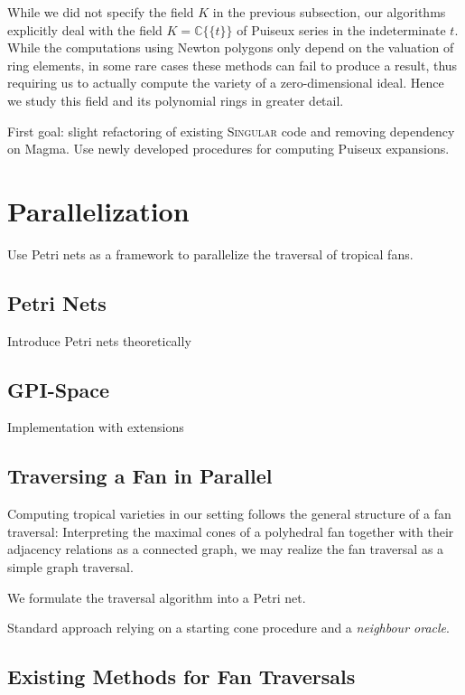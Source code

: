 \documentclass[
  paper=a4,
  DIV=14,
  fontsize=12pt,
  titlepage,
  bibliography=totoc,
  listof=totoc,
  pagesize=pdftex
]{scrartcl}
\numberwithin{figure}{section}
\numberwithin{equation}{section}
\numberwithin{table}{section}
\newcommand*\setC{\mathds{C}}
\newcommand*\puiseux[2]{#1\{\!\{#2\}\!\}}
\newcommand*\CCt{\puiseux{\setC}{t}}
\theoremstyle{definition}
\numberwithin{definition}{section}
\begin{document}
While we did not specify the field $K$ in the previous subsection, our algorithms
explicitly deal with the field $K = \CCt$ of Puiseux series in the indeterminate
$t$. While the computations using Newton polygons only depend on the valuation of ring
elements, in some rare cases these methods can fail to produce a result, thus requiring us
to actually compute the variety of a zero-dimensional ideal. Hence we study this field and
its polynomial rings in greater detail.

First goal: slight refactoring of existing \textsc{Singular} code and removing dependency on
Magma. Use newly developed procedures for computing Puiseux expansions.

\section{Parallelization}

Use Petri nets as a framework to parallelize the traversal of tropical fans.

\subsection{Petri Nets}

Introduce Petri nets theoretically

\subsection{GPI-Space}

Implementation with extensions

\subsection{Traversing a Fan in Parallel}

Computing tropical varieties in our setting follows the general structure of a fan
traversal: Interpreting the maximal cones of a polyhedral fan together with their
adjacency relations as a connected graph, we may realize the fan traversal as a simple
graph traversal.

We formulate the traversal algorithm into a Petri net.

Standard approach relying on a starting cone procedure and a \emph{neighbour oracle}.

\subsection{Existing Methods for Fan Traversals}
\end{document}
